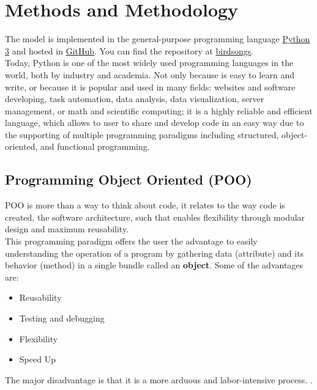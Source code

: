 \chapter{Methods and Methodology}\label{chap_methodology}

The model is implemented in the general-purpose programming language \href{https://www.python.org/}{Python 3} and hosted in \href{https://github.com/}{GitHub}. You can find the repository at \href{https://saguileran.github.io/birdsongs/}{birdsongs}.\\

Today, Python is one of the most widely used programming languages in the world, both by industry and academia. Not only because is easy to learn and write, or because it is popular and used in many fields: websites and software developing, task automation, data analysis, data visualization, server management, or math and scientific computing; it is a highly reliable and efficient language, which allows to user to share and develop code in an easy way due to the supporting of multiple programming paradigms including structured, object-oriented, and functional programming.


\section{Programming Object Oriented (POO)}

POO is more than a way to think about code, it relates to the way  code is created, the software architecture, such that enables flexibility through modular design and maximum reusability. \cite{poo} \\

This programming paradigm offers the user the advantage to easily understanding the operation of a program by gathering data (attribute) and its behavior (method) in a single bundle called an \textbf{object}. Some of the advantages are:

\begin{itemize}
    \item Reusability
    \item Testing and debugging
    \item Flexibility
    \item Speed Up
    
\end{itemize}

The major disadvantage is that it is a more arduous and labor-intensive process. \cite{poo_coursera}.

